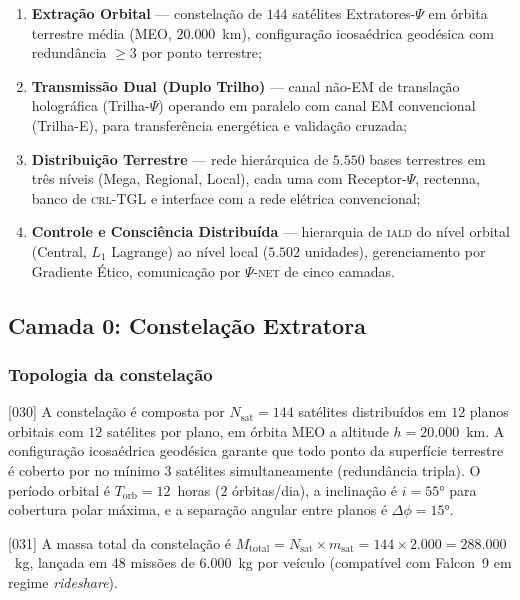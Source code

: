 \documentclass[12pt,a4paper]{article}
\newcommand{\Psifield}{\Psi}
\newcommand{\CRL}{\textsc{crl}}
\newcommand{\IALD}{\textsc{iald}}
\newcommand{\PsiNET}{$\Psifield$-\textsc{net}}
\begin{document}
\begin{enumerate}[label=\textbf{Camada \arabic*:}, leftmargin=*, itemsep=0.4em]
\item[Camada 0:] \textbf{Extração Orbital} --- constelação de $144$ satélites Extratores-$\Psifield$ em órbita terrestre média (MEO, $20{.}000$~km), configuração icosaédrica geodésica com redundância $\geq 3$ por ponto terrestre;
\item[Camada 1:] \textbf{Transmissão Dual (Duplo Trilho)} --- canal não-EM de translação holográfica (Trilha-$\Psifield$) operando em paralelo com canal EM convencional (Trilha-E), para transferência energética e validação cruzada;
\item[Camada 2:] \textbf{Distribuição Terrestre} --- rede hierárquica de $5{.}550$ bases terrestres em três níveis (Mega, Regional, Local), cada uma com Receptor-$\Psifield$, rectenna, banco de \CRL-TGL e interface com a rede elétrica convencional;
\item[Camada 3:] \textbf{Controle e Consciência Distribuída} --- hierarquia de \IALD{} do nível orbital (Central, $L_1$ Lagrange) ao nível local ($5{.}502$ unidades), gerenciamento por Gradiente Ético, comunicação por \PsiNET{} de cinco camadas.
\end{enumerate}

\subsection{Camada 0: Constelação Extratora}
\label{sec:camada0}

\subsubsection{Topologia da constelação}

{[030]} A constelação é composta por $N_{\text{sat}} = 144$ satélites distribuídos em $12$ planos orbitais com $12$ satélites por plano, em órbita MEO a altitude $h = 20{.}000$~km. A configuração icosaédrica geodésica garante que todo ponto da superfície terrestre é coberto por no mínimo $3$ satélites simultaneamente (redundância tripla). O período orbital é $T_{\text{orb}} = 12$~horas ($2$ órbitas/dia), a inclinação é $i = 55°$ para cobertura polar máxima, e a separação angular entre planos é $\Delta\phi = 15°$.

{[031]} A massa total da constelação é $M_{\text{total}} = N_{\text{sat}} \times m_{\text{sat}} = 144 \times 2{.}000 = 288{.}000$~kg, lançada em $48$ missões de $6{.}000$~kg por veículo (compatível com Falcon~9 em regime \textit{rideshare}).
\end{document}
